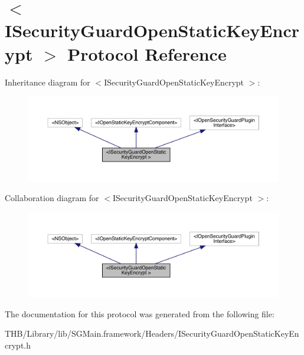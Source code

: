 \hypertarget{protocol_i_security_guard_open_static_key_encrypt_01-p}{}\section{$<$I\+Security\+Guard\+Open\+Static\+Key\+Encrypt $>$ Protocol Reference}
\label{protocol_i_security_guard_open_static_key_encrypt_01-p}


Inheritance diagram for $<$I\+Security\+Guard\+Open\+Static\+Key\+Encrypt $>$\+:\nopagebreak
\begin{figure}[H]
\begin{center}
\leavevmode
\includegraphics[width=350pt]{protocol_i_security_guard_open_static_key_encrypt_01-p__inherit__graph}
\end{center}
\end{figure}


Collaboration diagram for $<$I\+Security\+Guard\+Open\+Static\+Key\+Encrypt $>$\+:\nopagebreak
\begin{figure}[H]
\begin{center}
\leavevmode
\includegraphics[width=350pt]{protocol_i_security_guard_open_static_key_encrypt_01-p__coll__graph}
\end{center}
\end{figure}


The documentation for this protocol was generated from the following file\+:\begin{DoxyCompactItemize}
\item 
T\+H\+B/\+Library/lib/\+S\+G\+Main.\+framework/\+Headers/I\+Security\+Guard\+Open\+Static\+Key\+Encrypt.\+h\end{DoxyCompactItemize}
